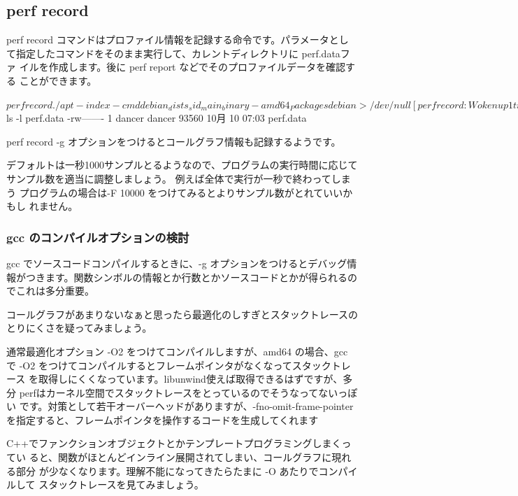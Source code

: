\documentclass[mingoth,a4paper]{jsarticle}
\begin{document}
\subsection{perf record}

perf record コマンドはプロファイル情報を記録する命令です。パラメータとし
て指定したコマンドをそのまま実行して、カレントディレクトリに perf.dataファ
イルを作成します。後に perf report などでそのプロファイルデータを確認する
ことができます。

\begin{commandline}
$ perf record ./apt-index-cmd debian_dists_sid_main_binary-amd64_Packages  debian > /dev/null
[ perf record: Woken up 1 times to write data ]
[ perf record: Captured and wrote 0.087 MB perf.data (~3800 samples) ]
$ ls -l perf.data
-rw------- 1 dancer dancer 93560 10月 10 07:03 perf.data

\end{commandline}

perf record -g オプションをつけるとコールグラフ情報も記録するようです。

デフォルトは一秒1000サンプルとるようなので、プログラムの実行時間に応じて
サンプル数を適当に調整しましょう。 例えば全体で実行が一秒で終わってしまう
プログラムの場合は-F 10000 をつけてみるとよりサンプル数がとれていいかもし
れません。

\subsubsection{gcc のコンパイルオプションの検討}

gcc でソースコードコンパイルするときに、-g オプションをつけるとデバッグ情
報がつきます。関数シンボルの情報とか行数とかソースコードとかが得られるの
でこれは多分重要。

コールグラフがあまりないなぁと思ったら最適化のしすぎとスタックトレースの
とりにくさを疑ってみましょう。

通常最適化オプション -O2 をつけてコンパイルしますが、amd64 の場合、gcc で
-O2 をつけてコンパイルするとフレームポインタがなくなってスタックトレース
を取得しにくくなっています。libunwind使えば取得できるはずですが、多分
perfはカーネル空間でスタックトレースをとっているのでそうなってないっぽい
です。対策として若干オーバーヘッドがありますが、-fno-omit-frame-pointer
を指定すると、フレームポインタを操作するコードを生成してくれます

C++でファンクションオブジェクトとかテンプレートプログラミングしまくってい
ると、関数がほとんどインライン展開されてしまい、コールグラフに現れる部分
が少なくなります。理解不能になってきたらたまに -O あたりでコンパイルして
スタックトレースを見てみましょう。
\end{document}
